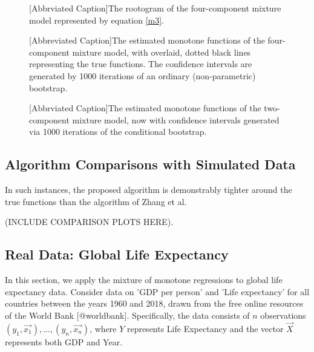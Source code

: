 \documentclass[10pt]{olplainarticle}\usepackage[]{graphicx}\usepackage[]{color}
\begin{document}

\begin{figure}

[Abbrviated Caption]{The rootogram of the four-component mixture model represented by equation \ref{m3}.}
\end{figure}

\begin{figure}

[Abbreviated Caption]{The estimated monotone functions of the four-component mixture model, with overlaid, dotted black lines representing the true functions. The confidence intervals are generated by 1000 iterations of an ordinary (non-parametric) bootstrap.}
\end{figure}


\begin{figure}

[Abbrviated Caption]{The estimated monotone functions of the two-component mixture model, now with confidence intervals generated via 1000 iterations of the conditional bootstrap.}
\end{figure}






\subsection{Algorithm Comparisons with Simulated Data}

In such instances, the proposed algorithm is demonstrably tighter around the true functions than the algorithm of Zhang et al. 

(INCLUDE COMPARISON PLOTS HERE).



\subsection{Real Data: Global Life Expectancy }

In this section, we apply the mixture of monotone regressions to global life expectancy data. Consider data on 'GDP per person' and 'Life expectancy' for all countries between the years 1960 and 2018, drawn from the free online resources of the World Bank [@worldbank]. Specifically, the data consists of $n$ observations $(y_1, \vec{x_1}),...,(y_n,\vec{x_n})$, where $Y$ represents Life Expectancy and the vector $\vec{X}$ represents both GDP and Year. 
\end{document}
